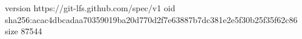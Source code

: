 version https://git-lfs.github.com/spec/v1
oid sha256:acac4dbcadaa70359019ba20d770d2f7e63887b7dc381e2e5f30b25f35f62c86
size 87544
